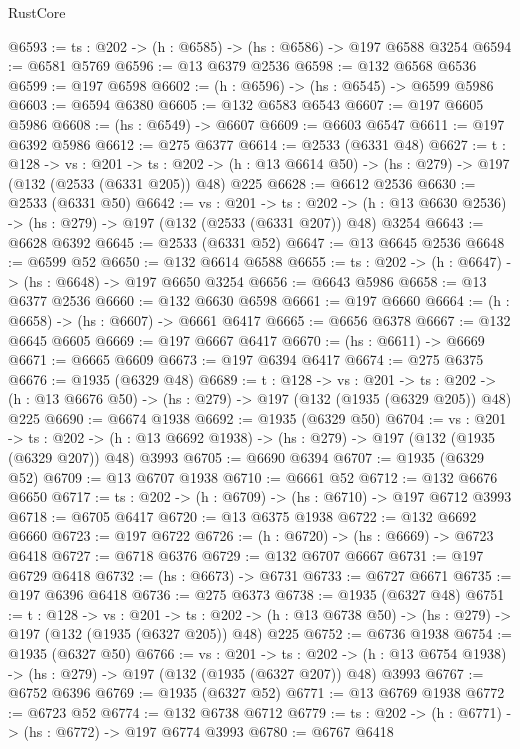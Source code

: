 \begin{lexlean}{RustCore}
\begin{coremodule}
@6593 := {ts : @202} -> (h : @6585) -> (hs : @6586) -> @197 @6588 @3254
@6594 := @6581 @5769
@6596 := @13 @6379 @2536
@6598 := @132 @6568 @6536
@6599 := @197 @6598
@6602 := (h : @6596) -> (hs : @6545) -> @6599 @5986
@6603 := @6594 @6380
@6605 := @132 @6583 @6543
@6607 := @197 @6605 @5986
@6608 := (hs : @6549) -> @6607
@6609 := @6603 @6547
@6611 := @197 @6392 @5986
@6612 := @275 @6377
@6614 := @2533 (@6331 @48)
@6627 := {t : @128} ->
  {vs : @201} ->
  {ts : @202} -> (h : @13 @6614 @50) -> (hs : @279) -> @197 (@132 (@2533 (@6331 @205)) @48) @225
@6628 := @6612 @2536
@6630 := @2533 (@6331 @50)
@6642 := {vs : @201} ->
  {ts : @202} -> (h : @13 @6630 @2536) -> (hs : @279) -> @197 (@132 (@2533 (@6331 @207)) @48) @3254
@6643 := @6628 @6392
@6645 := @2533 (@6331 @52)
@6647 := @13 @6645 @2536
@6648 := @6599 @52
@6650 := @132 @6614 @6588
@6655 := {ts : @202} -> (h : @6647) -> (hs : @6648) -> @197 @6650 @3254
@6656 := @6643 @5986
@6658 := @13 @6377 @2536
@6660 := @132 @6630 @6598
@6661 := @197 @6660
@6664 := (h : @6658) -> (hs : @6607) -> @6661 @6417
@6665 := @6656 @6378
@6667 := @132 @6645 @6605
@6669 := @197 @6667 @6417
@6670 := (hs : @6611) -> @6669
@6671 := @6665 @6609
@6673 := @197 @6394 @6417
@6674 := @275 @6375
@6676 := @1935 (@6329 @48)
@6689 := {t : @128} ->
  {vs : @201} ->
  {ts : @202} -> (h : @13 @6676 @50) -> (hs : @279) -> @197 (@132 (@1935 (@6329 @205)) @48) @225
@6690 := @6674 @1938
@6692 := @1935 (@6329 @50)
@6704 := {vs : @201} ->
  {ts : @202} -> (h : @13 @6692 @1938) -> (hs : @279) -> @197 (@132 (@1935 (@6329 @207)) @48) @3993
@6705 := @6690 @6394
@6707 := @1935 (@6329 @52)
@6709 := @13 @6707 @1938
@6710 := @6661 @52
@6712 := @132 @6676 @6650
@6717 := {ts : @202} -> (h : @6709) -> (hs : @6710) -> @197 @6712 @3993
@6718 := @6705 @6417
@6720 := @13 @6375 @1938
@6722 := @132 @6692 @6660
@6723 := @197 @6722
@6726 := (h : @6720) -> (hs : @6669) -> @6723 @6418
@6727 := @6718 @6376
@6729 := @132 @6707 @6667
@6731 := @197 @6729 @6418
@6732 := (hs : @6673) -> @6731
@6733 := @6727 @6671
@6735 := @197 @6396 @6418
@6736 := @275 @6373
@6738 := @1935 (@6327 @48)
@6751 := {t : @128} ->
  {vs : @201} ->
  {ts : @202} -> (h : @13 @6738 @50) -> (hs : @279) -> @197 (@132 (@1935 (@6327 @205)) @48) @225
@6752 := @6736 @1938
@6754 := @1935 (@6327 @50)
@6766 := {vs : @201} ->
  {ts : @202} -> (h : @13 @6754 @1938) -> (hs : @279) -> @197 (@132 (@1935 (@6327 @207)) @48) @3993
@6767 := @6752 @6396
@6769 := @1935 (@6327 @52)
@6771 := @13 @6769 @1938
@6772 := @6723 @52
@6774 := @132 @6738 @6712
@6779 := {ts : @202} -> (h : @6771) -> (hs : @6772) -> @197 @6774 @3993
@6780 := @6767 @6418

\end{coremodule}
\end{lexlean}
